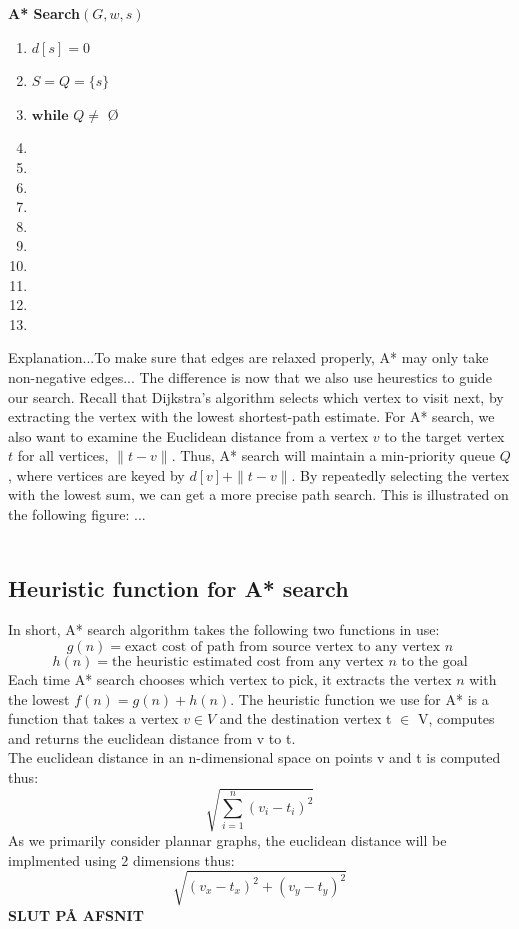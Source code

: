 \documentclass[11pt]{article}
\begin{document}
\textbf{A* Search$(G, w, s)$}
\begin{enumerate}
\setlength\itemsep{0em}
\item $d[s] = 0$
\item $S = Q = \{s\}$
\item $\textbf{while } Q \neq  $ \O
\item {}
\item {}
\item \tab{}
\item {}
\item \tab{}
\item \tab{}\tab{}
\item \tab{}\tab{}
\item \tab{}\tab{}
\item \tab{}\tab{}
\item \tab{}\tab{}
\end{enumerate}
Explanation...To make sure that edges are relaxed properly, A* may only take non-negative edges...
The difference is now that we also use heurestics to guide our search. Recall that Dijkstra's algorithm selects which vertex to visit next, by extracting the vertex with the lowest shortest-path estimate. For A* search, we also want to examine the Euclidean distance from a vertex $v$ to the target vertex $t$ for all vertices, $\|t-v\|$. Thus, A* search will maintain a min-priority queue $Q$, where vertices are keyed by $d[v]+\|t-v\|$. By repeatedly selecting the vertex with the lowest sum, we can get a more precise path search. This is illustrated on the following figure: ...\\\\

\subsection{Heuristic function for A* search}
In short, A* search algorithm takes the following two functions in use:
$$g(n) = \text{exact cost of path from source vertex to any vertex } n$$
$$h(n) = \text{the heuristic estimated cost from any vertex } n \text{ to the goal}$$
Each time A* search chooses which vertex to pick, it extracts the vertex $n$ with the lowest $f(n) = g(n)+h(n)$. The heuristic function we use for A* is a function that takes a vertex $v \in V$  and the destination vertex t $\in$ V, computes and returns the euclidean distance from v to t.\\
The euclidean distance in an n-dimensional space on points v and t is computed thus:\\
$$\sqrt{\displaystyle\sum_{i=1}^{n} (v_i - t_i)^2}$$
As we primarily consider plannar graphs, the euclidean distance will be implmented using 2 dimensions thus:\\
$$\sqrt{(v_x - t_x)^2 + (v_y - t_y)^2}$$
\textbf{SLUT PÅ AFSNIT}\\
\end{document}
